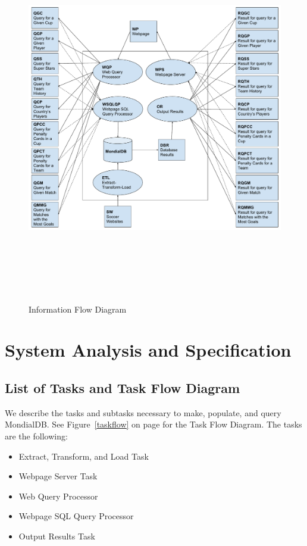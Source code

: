 \documentclass{article}
\begin{document}
\begin{figure}[ph]
\includegraphics[height=462pt, angle=90]{dbflowdiagram}
\caption{Information Flow Diagram}
\label{flow}
\end{figure}

\clearpage

\section{System Analysis and Specification}
\subsection{List of Tasks and Task Flow Diagram}
We describe the tasks and subtasks necessary to make, populate, and query MondialDB. 
See Figure~\ref{taskflow} on page \pageref{taskflow} for the Task Flow Diagram. 
The tasks are the following:
\begin{itemize}
  \item Extract, Transform, and Load Task
  \item Webpage Server Task
  \item Web Query Processor
  \item Webpage SQL Query Processor
  \item Output Results Task
\end{itemize}
\end{document}
